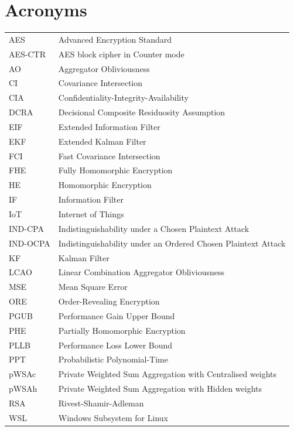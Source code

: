 \documentclass[oneside]{scrbook}
\theoremstyle{definition}
\theoremstyle{definition}
\theoremstyle{remark}
\begin{document}
\section*{Acronyms}
\begin{longtable}{p{}p{}}
    AES & Advanced Encryption Standard\\
    AES-CTR & AES block cipher in Counter mode\\
    AO & Aggregator Obliviousness\\
    CI & Covariance Intersection\\
    CIA & Confidentiality-Integrity-Availability\\
    DCRA & Decisional Composite Residuosity Assumption\\
    EIF & Extended Information Filter\\
    EKF & Extended Kalman Filter\\
    FCI & Fast Covariance Intersection\\
    FHE & Fully Homomorphic Encryption\\
    HE & Homomorphic Encryption\\
    IF & Information Filter\\
    IoT & Internet of Things\\
    IND-CPA & Indistinguishability under a Chosen Plaintext Attack\\
    IND-OCPA & Indistinguishability under an Ordered Chosen Plaintext Attack\\
    KF & Kalman Filter\\
    LCAO & Linear Combination Aggregator Obliviousness\\
    MSE & Mean Square Error\\
    ORE & Order-Revealing Encryption\\
    PGUB & Performance Gain Upper Bound\\
    PHE & Partially Homomorphic Encryption\\
    PLLB & Performance Loss Lower Bound\\
    PPT & Probabilistic Polynomial-Time\\
    pWSAc & Private Weighted Sum Aggregation with Centralised weights\\
    pWSAh & Private Weighted Sum Aggregation with Hidden weights\\
    RSA & Rivest-Shamir-Adleman\\
    WSL & Windows Subsystem for Linux
\end{longtable}
\end{document}
